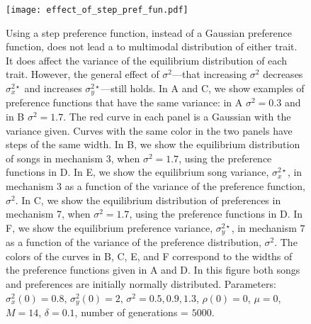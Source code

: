 \documentclass{article}
\begin{document}
\begin{figure}
\texttt{[image: effect\_of\_step\_pref\_fun.pdf]}
\caption{\label{effect_of_step_function} Using a step preference function, instead of a Gaussian preference function, does not lead a to multimodal distribution of either trait. It does affect the variance of the equilibrium distribution of each trait. However, the general effect of $\sigma^2$---that increasing $\sigma^2$ decreases $\sigma_x^{2\star}$ and increases $\sigma_y^{2\star}$---still holds.  In A and C, we show examples of preference functions that have the same variance: in A $\sigma^2=0.3$ and in B $\sigma^2=1.7$. The red curve in each panel is a Gaussian with the variance given. Curves with the same color in the two panels have steps of the same width. In B, we show the equilibrium distribution of songs in mechanism 3, when $\sigma^2=1.7$, using the preference functions in D. In E, we show the equilibrium song variance, $\sigma_x^{2\star}$, in mechanism $3$ as a function of the variance of the preference function, $\sigma^2$. In C, we show the equilibrium distribution of preferences in mechanism 7, when $\sigma^2=1.7$, using the preference functions in D. In F, we show the equilibrium preference variance, $\sigma_y^{2\star}$, in mechanism $7$ as a function of the variance of the preference distribution, $\sigma^2$. The colors of the curves in B, C, E, and F correspond to the widths of the preference functions given in A and D. In this figure both songs and preferences are initially normally distributed. Parameters: $\sigma_x^2(0)=0.8$, $\sigma_y^2(0)=2$, $\sigma^2=0.5,0.9,1.3$, $\rho(0)=0$, $\mu=0$, $M=14$, $\delta=0.1$, number of generations = $5000$. }
\end{figure}


%
\end{document}
